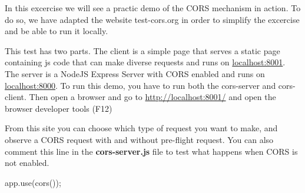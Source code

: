 \begin{Exercise}[label={websec-cors-practs}]
	In this excercise we will see a practic demo of the CORS mechanism in action. To do so, we have adapted the website test-cors.org in order to simplify the excercise and be able to run it locally. 
	
	This test has two parts. The client is a simple page that serves a static page containing js code that can make diverse requests and runs on \url{localhost:8001}. The server is a NodeJS Express Server with CORS enabled and runs on \url{localhost:8000}. To run this demo, you have to run both the cors-server and cors-client. Then open a browser and go to \url{http://localhost:8001/} and open the browser developer tools (F12)
	
	From this site you can choose which type of request you want to make, and observe a CORS request with and without pre-flight request. 
	You can also comment this line in the \textbf{cors-server.js} file to test what happens when CORS is not enabled.
	\begin{js}app.use(cors());\end{js} 

\end{Exercise}

\begin{Answer}[ref={websec-cors-practs}]
\end{Answer}